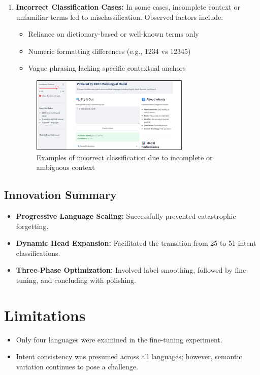 \documentclass{ecai}
\begin{document}
\begin{enumerate}
    \item \textbf{Incorrect Classification Cases:} In some cases, incomplete context or unfamiliar terms led to misclassification. Observed factors include:
    \begin{itemize}
        \item Reliance on dictionary-based or well-known terms only
        \item Numeric formatting differences (e.g., 1234 vs 12345)
        \item Vague phrasing lacking specific contextual anchors
    \end{itemize}
    
    \begin{figure}[H]
    \centering
    \includegraphics[width=0.7\linewidth]{result4.png}
    \caption{Examples of incorrect classification due to incomplete or ambiguous context}
    \end{figure}
\end{enumerate}

\subsection{Innovation Summary}
\begin{itemize}
    \item \textbf{Progressive Language Scaling:} Successfully prevented catastrophic forgetting.
    \item \textbf{Dynamic Head Expansion:} Facilitated the transition from 25 to 51 intent classifications.
    \item \textbf{Three-Phase Optimization:} Involved label smoothing, followed by fine-tuning, and concluding with polishing.
\end{itemize}

\section{Limitations}
\begin{itemize}
    \item Only four languages were examined in the fine-tuning experiment.
    \item Intent consistency was presumed across all languages; however, semantic variation continues to pose a challenge.
\end{itemize}
\end{document}
